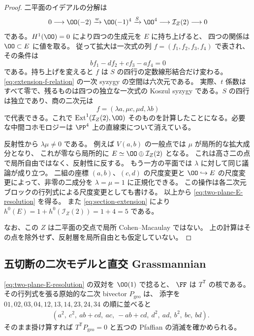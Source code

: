 \begin{proof}
二平面のイデアルの分解は
\[
 0\longrightarrow\OO(-2)\xrightarrow{w}\OO(-1)^4
 \xrightarrow{S}\OO^4\longrightarrow\mathcal I_Z(2)
 \longrightarrow0
\]
である。$H^1(\OO)=0$ により四つの生成元を $E$ に持ち上げると、
四つの関係は $\OO\subset E$ に値を取る。
従って拡大は一次式の列 $f=(f_1,f_2,f_3,f_4)$ で表され、
その条件は
\begin{equation}
 bf_1-df_2+cf_3-af_4=0
 \label{eq:extension-f-relation}
\end{equation}
である。持ち上げを変えると $f$ は $S$ の四行の定数線形結合だけ変わる。
\eqref{eq:extension-f-relation} の一次 syzygy の空間は六次元である。
実際、$t$ 係数はすべて零で、残るものは四つの独立な一次式の
Koszul syzygy である。$S$ の四行は独立であり、商の二次元は
\begin{equation}
 f=(\lambda a,\mu c,\mu d,\lambda b)
 \label{eq:two-extension-parameters}
\end{equation}
で代表できる。これで $\operatorname{Ext}^1(\mathcal I_Z(2),\OO)$
そのものを計算したことになる。必要な中間コホモロジーは
$\PP^4$ 上の直線束について消えている。

反射性から $\lambda\mu\neq0$ である。
例えば $V(a,b)$ の一般点では $\mu$ が局所的な拡大成分となり、
これが零なら局所的に $E\simeq\OO\oplus\mathcal I_Z(2)$ となる。
これは高さ二の点で局所自由ではなく、反射性に反する。
もう一方の平面では $\lambda$ に対して同じ議論が成り立つ。
二組の座標 $(a,b)$、$(c,d)$ の尺度変更と $\OO\hookrightarrow E$
の尺度変更によって、非零の二成分を $\lambda=\mu=1$ に正規化できる。
この操作は各二次元ブロックの行列式による尺度変更としても書ける。
以上から \eqref{eq:two-plane-E-resolution} を得る。
また \eqref{eq:section-extension} により
$h^0(E)=1+h^0(\mathcal I_Z(2))=1+4=5$ である。

なお、この $Z$ は二平面の交点で局所 Cohen--Macaulay ではない。
上の計算はその点を除外せず、反射層を局所自由とも仮定していない。
\end{proof}

\subsection{五切断の二次モデルと直交 Grassmannian}

\eqref{eq:two-plane-E-resolution} の双対を $\OO(1)$ で捻ると、
$\FF$ は $T^{\mathsf T}$ の核である。
その行列式を張る原始的な二次 bivector $P_{\mathrm{geo}}$ は、
添字を $01,02,03,04,12,13,14,23,24,34$ の順に並べると
\begin{equation}
 \begin{split}
 &(a^2,\ c^2,\ ab+cd,\ ac,\ -ab+cd,\ d^2,\ ad,\ b^2,\ bc,\ bd).
 \end{split}
 \label{eq:geometric-ten-quadrics}
\end{equation}
そのまま掛け算すれば $T^{\mathsf T}P_{\mathrm{geo}}=0$ と五つの
Pfaffian の消滅を確かめられる。

